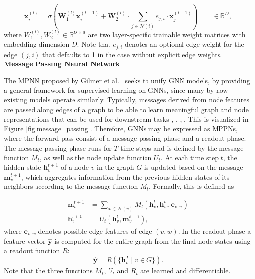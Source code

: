 \begin{equation}
    \label{eq:higher-order-gnn}
    \mathbf{x}_i^{(l)} = \sigma(\mathbf{W}_1^{(l)}\mathbf{x}_i^{(l-1)}+\mathbf{W}_2^{(l)}\cdot\sum_{j\in\mathcal{N}(i)}e_{j,i}\cdot \mathbf{x}_j^{(l-1)}) \qquad \in \mathbb{R}^{D},
\end{equation}
where $W_1^{(l)}, W_2^{(l)} \in \mathbb{R}^{D\times d}$ are two layer-specific trainable weight matrices with embedding dimension $D$. Note that $e_{j,i}$ denotes an optional edge weight for the edge $(j,i)$ that defaults to 1 in the case without explicit edge weights. 
\bigskip
\newpage
\textbf{Message Passing Neural Network}\par
The \ac{MPNN} proposed by Gilmer et al.~\cite{gilmer2017neural} seeks to unify GNN models, by providing a general framework for supervised learning on GNNs, since many by now existing models operate similarly. Typically, messages derived from node features are passed along edges of a graph to be able to learn meaningful graph and node representations that can be used for downstream tasks \cite{kipf2016semi}, \cite{4700287}, \cite{velivckovic2017graph}, \cite{xu2018powerful}. This is visualized in Figure \ref{fig:message_passing}. Therefore, GNNs may be expressed as MPPNs, where the forward pass consist of a message passing phase and a readout phase. The message passing phase runs for $T$ time steps and is defined by the message function $M_t$, as well as the node update function $U_t$. At each time step $t$, the hidden state $\mathbf{h}_v^{t+1}$ of a node $v$ in the graph $G$ is updated based on the message $\mathbf{m}_v^{t+1}$, which aggregates information from the previous hidden states of its neighbors according to the message function $M_t$. Formally, this is defined as

\begin{align}
    \mathbf{m}_v^{t+1} &= \sum_{w \in \mathcal{N}(v)} M_t\left(\mathbf{h}_v^t, \mathbf{h}_w^t, \mathbf{e}_{v,w}\right) \\
    \mathbf{h}_v^{t+1} &= U_t\left(\mathbf{h}_v^t, \mathbf{m}_v^{t+1}\right),
\end{align}
where $\mathbf{e}_{v,w}$ denotes possible edge features of edge $(v,w)$.
In the readout phase a feature vector $\hat{\mathbf{y}}$ is computed for the entire graph from the final node states  using a readout function $R$:
\begin{equation}
    \hat{\mathbf{y}} = R\left(\{ \mathbf{h}_v^T \mid v \in G \}\right).
\end{equation}
Note that the three functions $M_t$, $U_t$ and $R_t$ are learned and differentiable.
    
